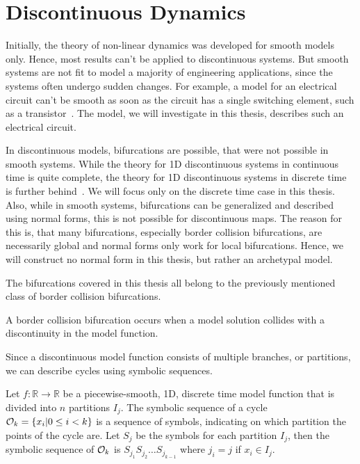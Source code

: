 \section{Discontinuous Dynamics}

Initially, the theory of non-linear dynamics was developed for smooth models only.
Hence, most results can't be applied to discontinuous systems.
But smooth systems are not fit to model a majority of engineering applications, since the systems often undergo sudden changes.
For example, a model for an electrical circuit can't be smooth as soon as the circuit has a single switching element, such as a transistor~\cite{ZhuMos03}.
The model, we will investigate in this thesis, describes such an electrical circuit.

In discontinuous models, bifurcations are possible, that were not possible in smooth systems.
While the theory for 1D discontinuous systems in continuous time is quite complete, the theory for 1D discontinuous systems in discrete time is further behind~\cite{Simpson16}.
We will focus only on the discrete time case in this thesis.
Also, while in smooth systems, bifurcations can be generalized and described using normal forms, this is not possible for discontinuous maps.
The reason for this is, that many bifurcations, especially border collision bifurcations, are necessarily global and normal forms only work for local bifurcations.
Hence, we will construct no normal form in this thesis, but rather an archetypal model.

The bifurcations covered in this thesis all belong to the previously mentioned class of border collision bifurcations.

\begin{definition}
	A border collision bifurcation occurs when a model solution collides with a discontinuity in the model function.
\end{definition}

Since a discontinuous model function consists of multiple branches, or partitions, we can describe cycles using symbolic sequences.

\begin{definition}
	Let $f: \mathbb{R} \to \mathbb{R}$ be a piecewise-smooth, 1D, discrete time model function that is divided into $n$ partitions $I_j$.
	The symbolic sequence of a cycle $\mathcal{O}_k = \{x_i | 0 \leq i < k\}$ is a sequence of symbols, indicating on which partition the points of the cycle are.
	Let $S_j$ be the symbols for each partition $I_j$, then the symbolic sequence of $\mathcal{O}_k$ is $S_{j_1} S_{j_2} \dots S_{j_{k-1}}$ where $j_i = j$ if $x_i \in I_j$.
\end{definition}

